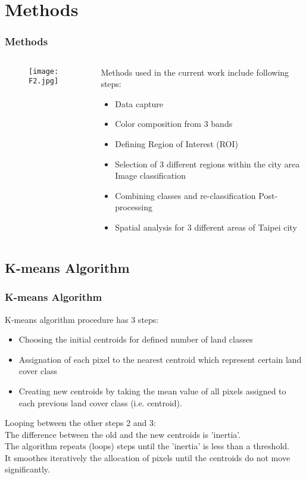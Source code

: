 \documentclass[pdflatex,compress,8pt,
	xcolor={dvipsnames,dvipsnames,svgnames,x11names,table},
	hyperref={colorlinks = true,breaklinks = true, urlcolor = NavyBlue, breaklinks = true}]{beamer}
\begin{document}
\section{Methods}
\begin{frame}\frametitle{Methods}
\begin{minipage}[0.4\textheight]{\textwidth}
\begin{columns}[T]
\begin{column}{0.5\textwidth}
\begin{figure}[H]
	\centering
		\texttt{[image: F2.jpg]}
\end{figure}
\end{column}
\begin{column}{0.5\textwidth}
Methods used in the current work include following steps:
\begin{itemize}
	\item Data capture
	\item Color composition from 3 bands
	\item Defining Region of Interest (ROI)
	\item Selection of 3 different regions within the city area Image classification
	\item Combining classes and re-classification Post-processing
	\item Spatial analysis for 3 different areas of Taipei city
\end{itemize}
\end{column}
\end{columns}
\end{minipage}
\end{frame}

\subsection{K-means Algorithm}
\begin{frame}\frametitle{K-means Algorithm}
K-means algorithm procedure has 3 steps:
\begin{itemize}
	\item Choosing the initial \alert{centroids} for defined number of land classes
	\item \alert{Assignation} of each pixel to the nearest centroid which represent certain land cover class
	\item Creating new centroids by taking the mean value of all pixels assigned to each previous land cover \alert{class} (i.e. centroid).
\end{itemize}
\alert{Looping} between the other steps 2 and 3: \\
The difference between the old and the new centroids is '\alert{inertia}'. \\
The algorithm repeats (loops) steps until the 'inertia' is less than a \alert{threshold}.\\
It \alert{smoothes iteratively} the allocation of pixels until the centroids do not move significantly.
\end{frame}
 
\end{document}
